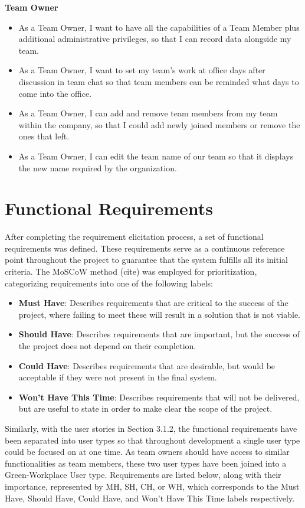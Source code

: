 \documentclass{l4proj}
\begin{document}
\textbf{Team Owner}
\begin{itemize}
    \item As a Team Owner, I want to have all the capabilities of a Team Member plus additional administrative privileges, so that I can record data alongside my team.
    \item As a Team Owner, I want to set my team's work at office days after discussion in team chat so that team members can be reminded what days to come into the office.
    \item As a Team Owner, I can add and remove team members from my team within the company, so that I could add newly joined members or remove the ones that left.
    \item As a Team Owner, I can edit the team name of our team so that it displays the new name required by the organization.
\end{itemize}

\section{Functional Requirements}

After completing the requirement elicitation process, a set of functional requirements was defined. These requirements serve as a continuous reference point throughout the project to guarantee that the system fulfills all its initial criteria. The MoSCoW method (cite) was employed for prioritization, categorizing requirements into one of the following labels:

\begin{itemize}
    \item \textbf{Must Have}: Describes requirements that are critical to the success of the project, where failing to meet these will result in a solution that is not viable.
    \item \textbf{Should Have}: Describes requirements that are important, but the success of the project does not depend on their completion.
    \item \textbf{Could Have}: Describes requirements that are desirable, but would be acceptable if they were not present in the final system.
    \item \textbf{Won’t Have This Time}: Describes requirements that will not be delivered, but are useful to state in order to make clear the scope of the project.
\end{itemize}

Similarly, with the user stories in Section 3.1.2, the functional requirements have been separated into user types so that throughout development a single user type could be focused on at one time. As team owners should have access to similar functionalities as team members, these two user types have been joined into a Green-Workplace User type. Requirements are listed below, along with their importance, represented by MH, SH, CH, or WH, which corresponds to the Must Have, Should Have, Could Have, and Won’t Have This Time labels respectively. 
\end{document}
